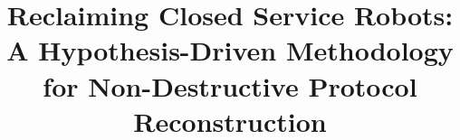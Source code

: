 \documentclass[conference]{IEEEtran}
\begin{document}
\title{Reclaiming Closed Service Robots: A Hypothesis-Driven
Methodology for Non-Destructive Protocol Reconstruction}

%

\maketitle














\end{document}
